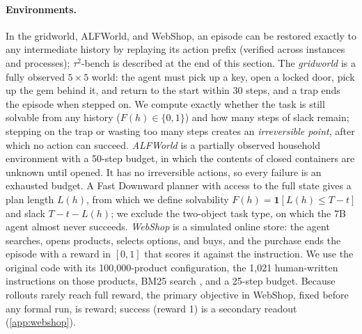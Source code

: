 \documentclass{article}
\newcommand{\tautwo}{$\tau^2$-bench}
\theoremstyle{plain}
\theoremstyle{definition}
\theoremstyle{remark}
\begin{document}
\paragraph{Environments.}
In the gridworld, ALFWorld, and WebShop, an episode can be restored exactly to any intermediate history by replaying its action prefix (verified across instances and processes); \tautwo{} is described at the end of this section. The \emph{gridworld} is a fully observed $5\times5$ world: the agent must pick up a key, open a locked door, pick up the gem behind it, and return to the start within 30 steps, and a trap ends the episode when stepped on. We compute exactly whether the task is still solvable from any history ($F(h)\in\{0,1\}$) and how many steps of slack remain; stepping on the trap or wasting too many steps creates an \emph{irreversible point}, after which no action can succeed. \emph{ALFWorld} \citep{shridhar2021alfworld} is a partially observed household environment with a 50-step budget, in which the contents of closed containers are unknown until opened. It has no irreversible actions, so every failure is an exhausted budget. A Fast Downward planner \citep{helmert2006fastdownward} with access to the full state gives a plan length $L(h)$, from which we define solvability $F(h)=\mathbf{1}[L(h)\le T-t]$ and slack $T-t-L(h)$; we exclude the two-object task type, on which the 7B agent almost never succeeds. \emph{WebShop} \citep{yao2022webshop} is a simulated online store: the agent searches, opens products, selects options, and buys, and the purchase ends the episode with a reward in $[0,1]$ that scores it against the instruction. We use the original code with its 100,000-product configuration, the 1,021 human-written instructions on those products, BM25 search \citep{lin2021pyserini}, and a 25-step budget. Because rollouts rarely reach full reward, the primary objective in WebShop, fixed before any formal run, is reward; success (reward 1) is a secondary readout (\cref{app:webshop}).
\end{document}
